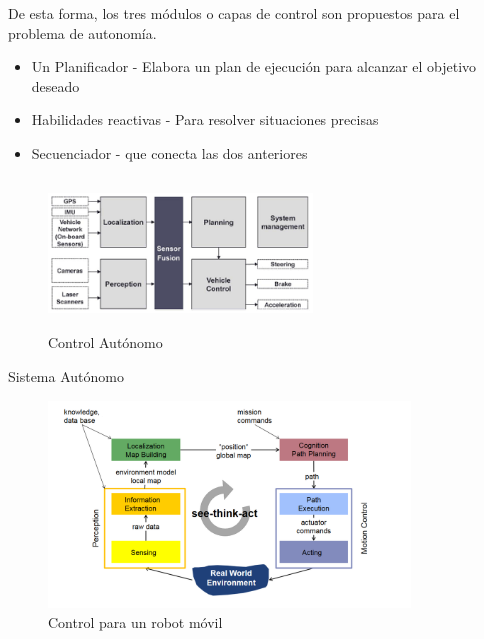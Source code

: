 \documentclass[
	11pt, %
]{beamer}
\begin{document}
\begin{frame}{}
  De esta forma, los tres m\'{o}dulos o capas de control son propuestos para el problema de autonom\'{i}a.
  \begin{itemize}
  \item Un Planificador - Elabora un plan de ejecuci\'{o}n para alcanzar el objetivo deseado
  \item Habilidades reactivas - Para resolver situaciones precisas
  \item Secuenciador - que conecta las dos anteriores
  \end{itemize}
  \begin{figure}
    \centering
    \includegraphics[width=7cm, height=4cm]{control_autonomo}
    \caption[Caption for LOF]{Control Aut\'{o}nomo\protect\footnotemark}
  \end{figure}
\end{frame}

\begin{frame}{Sistema Aut\'{o}nomo}
  
  \begin{figure}
    \centering
    \includegraphics[width=\textwidth, height=5.5cm]{sensar_planear_actuar}
    \caption[Caption for LOF]{Control para un robot m\'{o}vil\protect\footnotemark}
  \end{figure}
\end{frame}
\end{document}
